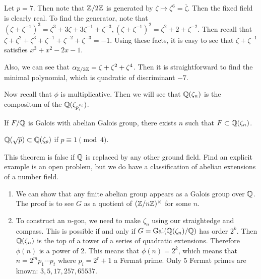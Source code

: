 \documentclass[10pt, twoside]{article}
\begin{document}
        \begin{exm} Let $p = 7$. Then note that $\mathbb{Z}/2\mathbb{Z}$ is generated by $\zeta
            \mapsto \zeta^6 = \overline{\zeta}$. Then the fixed field is
            clearly real. To find the generator, note that
            $(\zeta+\zeta^{-1})^3 = \zeta^3 + 3\zeta + 3 \zeta^{-1} +
            \zeta^{-3}, (\zeta+\zeta^{-1})^2 = \zeta^2+2+\zeta^{-2}$. Then
            recall that $\zeta + \zeta^2 + \zeta^3 + \zeta^{-1} + \zeta^{-2} +
            \zeta^{-3} = -1$. Using these facts, it is easy to see that
            $\zeta+\zeta^{-1}$ satisfies $x^3+x^2-2x-1$.

            Also, we can see that $\alpha_{\mathbb{Z}/3\mathbb{Z}} = \zeta + \zeta^2 +
        \zeta^4$. Then it is straightforward to find the minimal polynomial,
    which is quadratic of discriminant $-7$.  \end{exm}

        Now recall that $\phi$ is multiplicative. Then we will see that
        $\mathbb{Q}(\zeta_n)$ is the compositum of the $\mathbb{Q}(\zeta_{p_i^{e_i}})$.

        \begin{thm} If $F/\mathbb{Q}$ is Galois with abelian Galois
        group, there exists $n$ such that $F \subset \mathbb{Q}(\zeta_n)$.  \end{thm}

        \begin{exm} $\mathbb{Q}(\sqrt{p}) \subset \mathbb{Q}(\zeta_p)$ if $p \equiv 1 \pmod 4$.
        \end{exm}

        \begin{rmk} This theorem is false if $\mathbb{Q}$ is replaced by any other
        ground field. Find an explicit example is an open problem, but we do
    have a classification of abelian extensions of a number field.  \end{rmk}

        \begin{rmk} \begin{enumerate} \item We can show that any finite abelian
            group appears as a Galois group over $\mathbb{Q}$. The proof is to see $G$
            as a quotient of $(\mathbb{Z}/n\mathbb{Z})^{\times}$ for some $n$.  \item To
            construct an $n$-gon, we need to make $\zeta_n$ using our
            straightedge and compass. This is possible if and only if $G =
            \mathrm{Gal}(\mathbb{Q}(\zeta_n)/\mathbb{Q})$ has order $2^k$. Then $\mathbb{Q}(\zeta_n)$
            is the top of a tower of a series of quadratic extensions.
            Therefore $\phi(n)$ is a power of $2$. This means that $\phi(n) =
            2^k$, which means that $n = 2^mp_1\cdots p_t$ where $p_i = 2^r+1$ a
            Fermat prime. Only $5$ Fermat primes are known: $3,5,17,257,65537$.
    \end{enumerate} \end{rmk}
\end{document}
